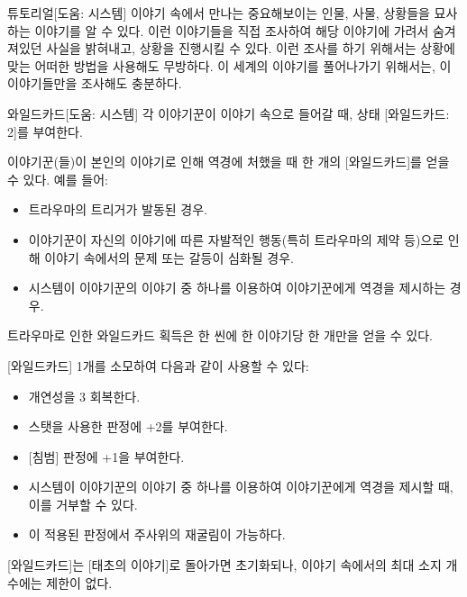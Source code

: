 \documentclass{report}
\begin{document}
	\begin{story}{튜토리얼}{[도움: 시스템]}
		이야기 속에서 만나는 중요해보이는 인물, 사물, 상황들을 묘사하는 이야기를 알 수 있다. 이런 이야기들을 직접 조사하여 해당 이야기에 가려서 숨겨져있던 사실을 밝혀내고, 상황을 진행시킬 수 있다. 이런 조사를 하기 위해서는 상황에 맞는 어떠한 방법을 사용해도 무방하다. 이 세계의 이야기를 풀어나가기 위해서는, 이 이야기들만을 조사해도 충분하다.
	\end{story}
	
	\begin{story}{와일드카드}{[도움: 시스템]}
		각 이야기꾼이 이야기 속으로 들어갈 때, 상태 [와일드카드: 2]를 부여한다.
		
		\smallskip
		
		이야기꾼(들)이 본인의 이야기로 인해 역경에 처했을 때 한 개의 [와일드카드]를 얻을 수 있다. 예를 들어:
		\begin{itemize}
			\item 트라우마의 트리거가 발동된 경우.
			\item 이야기꾼이 자신의 이야기에 따른 자발적인 행동(특히 트라우마의 제약 등)으로 인해 이야기 속에서의 문제 또는 갈등이 심화될 경우.
			\item 시스템이 이야기꾼의 이야기 중 하나를 이용하여 이야기꾼에게 역경을 제시하는 경우.
		\end{itemize}
		트라우마로 인한 와일드카드 획득은 한 씬에 한 이야기당 한 개만을 얻을 수 있다.
		
		\smallskip
		
		[와일드카드] 1개를 소모하여 다음과 같이 사용할 수 있다:
		\begin{itemize}
			\item 개연성을 3 회복한다.
			\item 스탯을 사용한 판정에 +2를 부여한다.
			\item {}[침범] 판정에 +1을 부여한다.
			\item 시스템이 이야기꾼의 이야기 중 하나를 이용하여 이야기꾼에게 역경을 제시할 때, 이를 거부할 수 있다.
			\item {}이 적용된 판정에서 주사위의 재굴림이 가능하다.
		\end{itemize}
		
		\smallskip
		
		[와일드카드]는 [태초의 이야기]로 돌아가면 초기화되나, 이야기 속에서의 최대 소지 개수에는 제한이 없다.
	\end{story}
\end{document}
